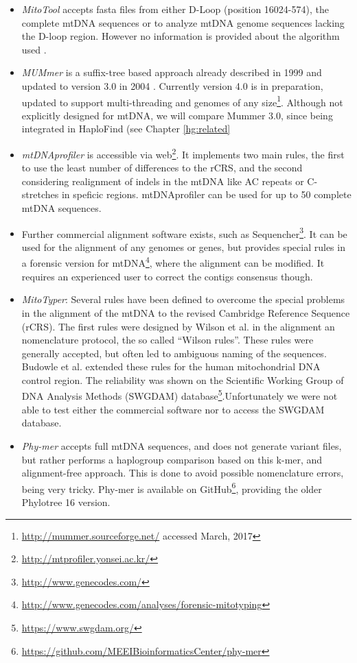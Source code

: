 \begin{itemize}
\item \textit{MitoTool} accepts fasta files from either D-Loop (position 16024-574), the complete mtDNA sequences or to analyze mtDNA genome sequences lacking the D-loop region. However no information is provided about the algorithm used \cite{Fan2011,Fan2013}.
\item \textit{MUMmer} is a suffix-tree based approach already described in 1999 \cite{Delcher1999} and updated to version 3.0 in 2004 \cite{Kurtz2004}. Currently version 4.0 is in preparation, updated to support multi-threading and genomes of any size\footnote{\url{http://mummer.sourceforge.net/} accessed March, 2017}. Although not explicitly designed for mtDNA, we will compare Mummer 3.0, since being integrated in HaploFind (see Chapter \ref{hg:related}
\item \textit{mtDNAprofiler} \cite{Yang2013} is accessible via web\footnote{\url{http://mtprofiler.yonsei.ac.kr/}}. It implements two main rules, the first to use the least number of differences to the rCRS, and the second considering realignment of indels in the mtDNA like AC repeats or C-stretches in speficic regions. mtDNAprofiler can be used for up to 50 complete mtDNA sequences.
\item Further commercial alignment software exists, such as Sequencher\footnote{\url{http://www.genecodes.com/}}. It can be used for the alignment of any genomes or genes, but provides special rules in a forensic version for mtDNA\footnote{\url{http://www.genecodes.com/analyses/forensic-mitotyping}}, where the alignment can be modified. It requires an experienced user to correct the contigs consensus though. 
\item \textit{MitoTyper}: Several rules have been defined to overcome the special problems in the alignment of the mtDNA to the revised Cambridge Reference Sequence (rCRS)\cite{Andrews1999}. The first rules were designed by Wilson et al. \cite{Wilson2003} in the alignment an nomenclature protocol, the so called “Wilson rules”. These rules were generally accepted, but often led to ambiguous naming of the sequences. Budowle et al. \cite{Budowle2010} extended these rules for the human mitochondrial DNA control region. The reliability was shown on the Scientific Working Group of DNA Analysis Methods (SWGDAM) database\footnote{\url{https://www.swgdam.org/}}.Unfortunately we were not able to test either the commercial software nor to access the SWGDAM database. 
\item \textit{Phy-mer} \cite{Navarro-gomez2014} accepts full mtDNA sequences, and does not generate variant files, but rather performs a haplogroup comparison based on this k-mer, and alignment-free approach. This is done to avoid possible nomenclature errors, being very tricky. Phy-mer is available on GitHub\footnote{\url{https://github.com/MEEIBioinformaticsCenter/phy-mer}}, providing  the older Phylotree 16 version.
\end{itemize}
